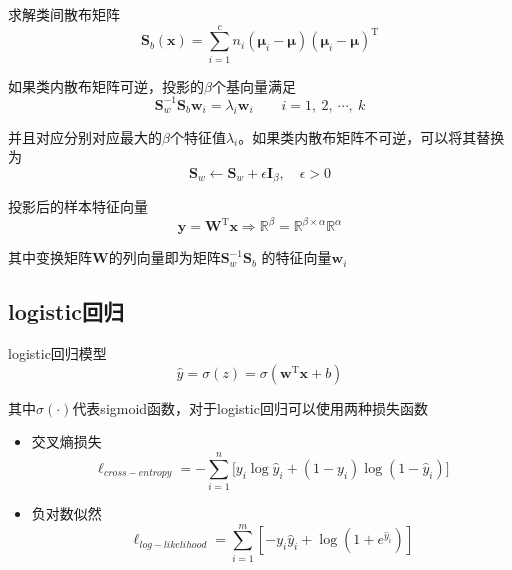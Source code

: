 \documentclass[notitlepage]{article}
\begin{document}
求解类间散布矩阵
\begin{equation*}
    \mathbf{S}_{b}(\boldsymbol{x}) = \sum_{i = 1}^{c} n_{i} 
    (\boldsymbol{\mu}_{i} - \boldsymbol{\mu})
    (\boldsymbol{\mu}_{i} - \boldsymbol{\mu})^{\mathrm{T}}
\end{equation*}

如果类内散布矩阵可逆，投影的$\beta$个基向量满足
\begin{equation*}
    \mathbf{S}_{w}^{-1} \mathbf{S}_{b} \boldsymbol{w}_{i} 
    = \lambda_{i} \boldsymbol{w}_{i}
    \qquad i = 1,\ 2,\ \cdots,\ k
\end{equation*}

并且对应分别对应最大的$\beta$个特征值$\lambda_{i}$。如果类内散布矩阵不可逆，可以将其替换为
\begin{equation*}
    \mathbf{S}_{w} \leftarrow \mathbf{S}_{w} + 
    \epsilon \mathbf{I}_{\beta},\quad \epsilon > 0
\end{equation*}

投影后的样本特征向量
\begin{equation*}
    \boldsymbol{y} = \mathbf{W}^{\mathrm{T}} \boldsymbol{x} 
    \Rightarrow \mathbb{R}^{\beta} 
    = \mathbb{R}^{\beta \times \alpha} \mathbb{R}^{\alpha}
\end{equation*}

其中变换矩阵$\mathbf{W}$的列向量即为矩阵$\mathbf{S}_{w}^{-1} \mathbf{S}_{b}$
的特征向量$\boldsymbol{w}_{i}$

\subsection*{logistic回归}

logistic回归模型
\begin{equation*}
    \hat{y} = \sigma(z) = 
    \sigma(\boldsymbol{w}^{\mathrm{T}} \boldsymbol{x} + b)
\end{equation*}

其中$\sigma(\cdot)$代表sigmoid函数，对于logistic回归可以使用两种损失函数

\begin{itemize}
    \item 交叉熵损失
    \begin{equation*}
        \ell_{cross-entropy} = -\sum_{i = 1}^{n} \bigg[ y_{i} \log \hat{y}_{i} + 
        (1 - y_{i}) \log (1 - \hat{y}_{i}) \bigg]
    \end{equation*}
    \item 负对数似然
    \begin{equation*}
        \ell_{log-likelihood} = \sum_{i = 1}^{m} \left[-y_{i} \hat{y}_{i} +
        \log(1 + e^{\hat{y}_{i}}) \right]
    \end{equation*}
\end{itemize}
\end{document}
